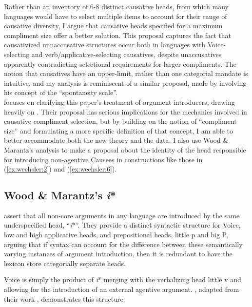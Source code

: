 \documentclass[output=paper,modfonts,nonflat]{langsci/langscibook}
\begin{document}
Rather than an inventory of 6-8 distinct causative heads, from which many languages would have to select multiple items to account for their range of causative diversity, I argue that causative heads specified for a maximum compliment size offer a better solution. This proposal captures the fact that causativized unnaccusative structures occur both in languages with Voice-selecting and verb/applicative-selecting causatives, despite unaccusatives apparently contradicting selectional requirements for larger compliments. The notion that causatives have an upper-limit, rather than one categorial mandate is intuitive, and my analysis is reminiscent of a similar proposal, made by \citet{Haspelmath2016} involving his concept of the “spontaneity scale”. \\

 focuses on clarifying this paper’s treatment of argument introducers, drawing heavily on \citet{WoodMarantz2017}. Their proposal has serious implications for the mechanics involved in causative compliment selection, but by building on the notion of “compliment size” and formulating a more specific definition of that concept, I am able to better accommodate both the new theory and the data. I also use Wood \& Marantz’s analysis to make a proposal about the identity of the head responsible for introducing non-agentive Causees in constructions like those in (\ref{ex:wechsler:2}) and (\ref{ex:wechsler:6}).

\subsection{Wood \& Marantz’s \textit{i}*}\label{sec:wechsler:2.2}

\citet{WoodMarantz2017} assert that all non-core arguments in any language are introduced by the same underspecified head, “\textit{i}*”. They provide a distinct syntactic structure for Voice, low and high applicative heads, and prepositional heads, little p and big P, arguing that if syntax can account for the difference between these semantically varying instances of argument introduction, then it is redundant to have the lexicon store categorially separate heads. 

Voice is simply the product of \textit{i}* merging with the verbalizing head little v and allowing for the introduction of an external agentive argument. , adapted from their work \citeyearpar[261]{WoodMarantz2017}, demonstrates this structure.
\end{document}
